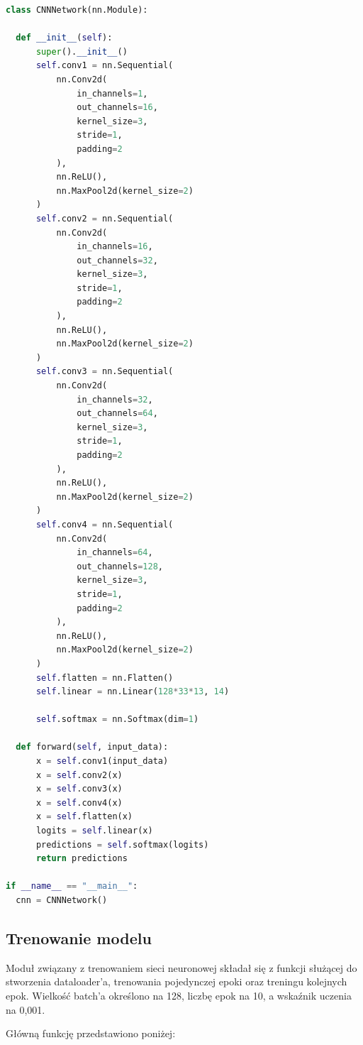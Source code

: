 \documentclass{sprz}
\begin{document}
\begin{lstlisting}[language=Python,caption={Implementacja sieci neuronowej}, label={lst:Sequelize_validate}]
  class CNNNetwork(nn.Module):

  def __init__(self):
      super().__init__()
      self.conv1 = nn.Sequential(
          nn.Conv2d(
              in_channels=1, 
              out_channels=16,  
              kernel_size=3,  
              stride=1,
              padding=2
          ),
          nn.ReLU(),
          nn.MaxPool2d(kernel_size=2)  
      )
      self.conv2 = nn.Sequential(
          nn.Conv2d(
              in_channels=16,
              out_channels=32,
              kernel_size=3,
              stride=1,
              padding=2
          ),
          nn.ReLU(),
          nn.MaxPool2d(kernel_size=2)
      )
      self.conv3 = nn.Sequential(
          nn.Conv2d(
              in_channels=32,
              out_channels=64,
              kernel_size=3,
              stride=1,
              padding=2
          ),
          nn.ReLU(),
          nn.MaxPool2d(kernel_size=2)
      )
      self.conv4 = nn.Sequential(
          nn.Conv2d(
              in_channels=64,
              out_channels=128,
              kernel_size=3,
              stride=1,
              padding=2
          ),
          nn.ReLU(),
          nn.MaxPool2d(kernel_size=2)
      )
      self.flatten = nn.Flatten()
      self.linear = nn.Linear(128*33*13, 14) 
                                             
      self.softmax = nn.Softmax(dim=1)

  def forward(self, input_data):
      x = self.conv1(input_data)
      x = self.conv2(x)
      x = self.conv3(x)
      x = self.conv4(x)
      x = self.flatten(x)
      logits = self.linear(x)
      predictions = self.softmax(logits)
      return predictions

if __name__ == "__main__":
  cnn = CNNNetwork()
\end{lstlisting}

\subsection{Trenowanie modelu}
Moduł związany z trenowaniem sieci neuronowej składał się z funkcji służącej do stworzenia dataloader'a, trenowania pojedynczej epoki oraz treningu kolejnych epok. Wielkość batch'a określono na 128, liczbę epok na 10, a wskaźnik uczenia na 0,001.

Główną funkcję przedstawiono poniżej:
\end{document}
